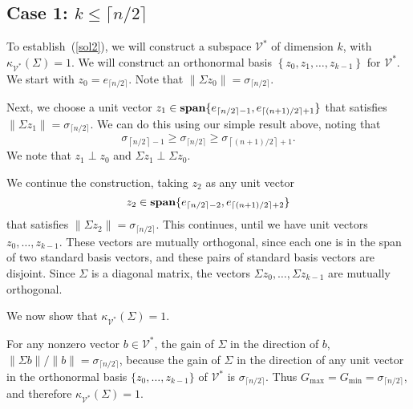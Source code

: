 \documentclass[12pt]{article}
\newcommand{\Span}{\mathop{\bf span}}%
\begin{document}
\subsection{Case 1: $k \leq \lceil n/2 \rceil$}

To establish~(\ref{sol2}), we will construct a subspace $\mathcal
V^*$ of dimension $k$, with $\kappa_{\mathcal V^*}(\Sigma)=1$.
We will construct an orthonormal basis
$\left\lbrace z_0, z_1, \ldots ,z_{k-1} \right\rbrace $
for $\mathcal V^*$. 
We start with $z_0=e_{\lceil n/2 \rceil }$.
Note that $\| \Sigma z_0 \| =\sigma_{\lceil n/2 \rceil }$.

Next, we choose a unit vector
$z_1 \in \Span \{ e_{\left\lceil n/2 \right\rceil -1}, e_{\lceil
(n+1)/2\rceil +1} \}$ that satisfies 
$\|\Sigma z_1 \| = \sigma_{\lceil n/2 \rceil }$.
We can do this using our simple result above,
noting that
\[
\sigma_{\left\lceil n/2 \right\rceil-1}\geq 
\sigma_{\lceil n/2 \rceil }
\geq \sigma_{\left\lceil (n+1)/2 \right\rceil+1}.
\]
We note that $z_1 \perp z_0$
and $\Sigma z_1 \perp \Sigma z_0$.


We continue the construction, taking $z_2$ as any unit vector
\[
z_2 \in \Span \{ e_{\left\lceil n/2 \right\rceil -2},e_{\lceil
(n+1)/2\rceil +2}\}
\]
that satisfies $\| \Sigma z_2\|=\sigma_{\lceil n/2 \rceil }$.
This continues, until we have unit vectors $z_0, \ldots, z_{k-1}$.
These vectors are mutually orthogonal, since each one is in the span
of two standard basis vectors, and these pairs of standard basis
vectors are disjoint. Since $\Sigma$ is a diagonal matrix,
the vectors $\Sigma z_0, \ldots, \Sigma z_{k-1}$ are
mutually orthogonal.

We now show that $\kappa_{\mathcal V^*}(\Sigma) = 1$.
\iffalse 
Let $b$ be any nonzero vector in
$\mathcal V^*$, say, 
$b = \beta_0 z_0 + \cdots + \beta_{k-1} z_{k-1}$.
The gain of $A$ in the direction $b$ is
\begin{eqnarray*}
\frac{\|Ab\|}{\|b\|} &=& 
\left( \frac{\beta_0^2  \|A z_0\|^2 + \cdots + \beta_{k-1}^2 \|A
z_{k-1} \|^2}
{\beta_0^2 \|z_0\|^2 + \cdots + \beta_{k-1}^2  \|z_{k-1}\|^2}
\right)^{1/2} \\
&=& 
\left( \frac{\beta_0^2 \sigma_{\lceil n/2 \rceil }^2 + \cdots +
\beta_{k-1}^2 \sigma_{\lceil n/2 \rceil }^2}
{\beta_0^2+ \cdots + \beta_{k-1}^2 }\right) ^{1/2}\\
&=& \sigma_{\lceil n/2 \rceil }.
\end{eqnarray*}
\fi
For any nonzero vector $b \in \mathcal V^*$, the gain of $\Sigma$
in the direction of $b$,  ${\|\Sigma b\| / \|b\|} =
\sigma_{\lceil n/2 \rceil }$, because the gain of $\Sigma$ in
the direction of any unit vector in the orthonormal basis
$\{z_0, \ldots, z_{k-1} \}$  of $\mathcal V^*$ is $\sigma_{\lceil
n/2 \rceil}$.
Thus $G_\mathrm{max} =G_\mathrm{min} = \sigma_{\lceil
n/2\rceil}$, and therefore ${\kappa_{\mathcal V^*}}(\Sigma) = 1$.
\end{document}
